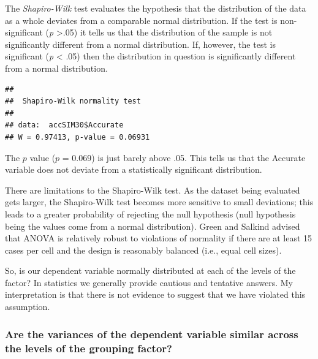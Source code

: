 \documentclass[
  english,
]{book}
\newenvironment{Shaded}{\begin{snugshade}}{\end{snugshade}}
\newcommand{\KeywordTok}[1]{\textcolor[rgb]{0.13,0.29,0.53}{\textbf{#1}}}
\newcommand{\NormalTok}[1]{#1}
\newcommand{\OperatorTok}[1]{\textcolor[rgb]{0.81,0.36,0.00}{\textbf{#1}}}
\begin{document}
The \emph{Shapiro-Wilk} test evaluates the hypothesis that the distribution of the data as a whole deviates from a comparable normal distribution. If the test is non-significant (\emph{p} \textgreater.05) it tells us that the distribution of the sample is not significantly different from a normal distribution. If, however, the test is significant (\emph{p} \textless{} .05) then the distribution in question is significantly different from a normal distribution.

\begin{Shaded}
\end{Shaded}

\begin{verbatim}
## 
##  Shapiro-Wilk normality test
## 
## data:  accSIM30$Accurate
## W = 0.97413, p-value = 0.06931
\end{verbatim}

The \(p\) value (\(p\) = 0.069) is just barely above .05. This tells us that the Accurate variable does not deviate from a statistically significant distribution.

There are limitations to the Shapiro-Wilk test. As the dataset being evaluated gets larger, the Shapiro-Wilk test becomes more sensitive to small deviations; this leads to a greater probability of rejecting the null hypothesis (null hypothesis being the values come from a normal distribution). Green and Salkind \citeyearpar{green_using_2014} advised that ANOVA is relatively robust to violations of normality if there are at least 15 cases per cell and the design is reasonably balanced (i.e., equal cell sizes).

So, is our dependent variable normally distributed at each of the levels of the factor? In statistics we generally provide cautious and tentative answers. My interpretation is that there is not evidence to suggest that we have violated this assumption.

\hypertarget{are-the-variances-of-the-dependent-variable-similar-across-the-levels-of-the-grouping-factor}{%
\subsubsection{Are the variances of the dependent variable similar across the levels of the grouping factor?}\label{are-the-variances-of-the-dependent-variable-similar-across-the-levels-of-the-grouping-factor}}
\end{document}
